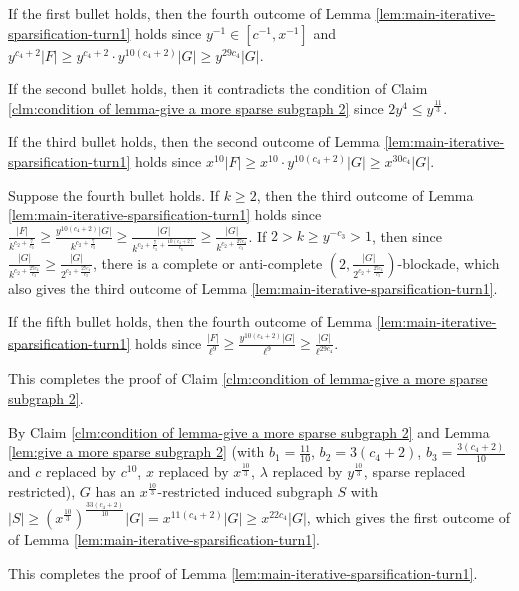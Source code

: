 \documentclass[a4paper,11pt]{article}
\let\oldendproof\endproof
\renewenvironment{proof}[1][\proofname]{%
	\oldproof[\normalfont\bfseries #1]%
}{\oldendproof}
\renewcommand{\qedsymbol}{$\square$}%
\newenvironment{subproof}[1][\normalfont\it Subproof]{%
	\renewcommand{\qedsymbol}{{\tiny{$\blacksquare$}}}%
	\begin{proof}[#1]%
	}{%
	\end{proof}%
}
\begin{document}
\begin{proof}
\begin{subproof}[Proof of Claim \ref{clm:condition of lemma-give a more sparse subgraph 2}]
            
            If the first bullet holds, then the fourth outcome of Lemma \ref{lem:main-iterative-sparsification-turn1} holds since $y^{-1}\in [c^{-1},x^{-1}]$ and $y^{c_4+2}|F|\geq y^{c_4+2}\cdot y^{10(c_4+2)}|G|\geq y^{29c_4}|G|$.

            If the second bullet holds, then it contradicts the condition of Claim \ref{clm:condition of lemma-give a more sparse subgraph 2} since $2y^4\leq y^{\frac{11}{3}}$.

            
            If the third bullet holds, then the second outcome of Lemma \ref{lem:main-iterative-sparsification-turn1} holds since $x^{10}|F|\geq x^{10}\cdot y^{10(c_4+2)}|G|\geq x^{30c_4}|G|$.  

            Suppose the fourth bullet holds. 
            If $k\geq2$, then the third outcome of Lemma \ref{lem:main-iterative-sparsification-turn1} holds since $\frac{|F|}{k^{c_2+\frac{7}{c_3}}}\geq \frac{y^{10(c_4+2)}|G|}{k^{c_2+\frac{7}{c_3}}}\geq \frac{|G|}{k^{c_2+\frac{7}{c_3}+\frac{10(c_4+2)}{c_3}}}\geq \frac{|G|}{k^{c_2+\frac{27c_4}{c_3}}}$. 
            If $2>k\geq y^{-c_3}> 1$, then since $\frac{|G|}{k^{c_2+\frac{27c_4}{c_3}}}\geq \frac{|G|}{2^{c_2+\frac{27c_4}{c_3}}}$, there is a complete or anti-complete $(2, \frac{|G|}{2^{c_2+\frac{27c_4}{c_3}}})$-blockade, which also gives the third outcome of Lemma \ref{lem:main-iterative-sparsification-turn1}.  

            If the fifth bullet holds, then the fourth outcome of Lemma \ref{lem:main-iterative-sparsification-turn1} holds since $\frac{|F|}{\ell^{9}}\geq \frac{y^{10(c_4+2)}|G|}{\ell^{9}}\geq \frac{|G|}{\ell^{29c_4}}$.  

            This completes the proof of Claim \ref{clm:condition of lemma-give a more sparse subgraph 2}. 
        \end{subproof}
        
        By Claim \ref{clm:condition of lemma-give a more sparse subgraph 2} and Lemma \ref{lem:give a more sparse subgraph 2} (with $b_1=\frac{11}{10}$, $b_2=3(c_4+2)$, $b_3=\frac{3(c_4+2)}{10}$ and $c$ replaced by $c^{10}$, $x$ replaced by $x^{\frac{10}{3}}$, $\lambda$ replaced by $y^{\frac{10}{3}}$, sparse replaced restricted), $G$ has an $x^{\frac{10}{3}}$-restricted induced subgraph $S$ with $|S|\geq (x^{\frac{10}{3}})^{\frac{33(c_4+2)}{10}}|G|= x^{11(c_4+2)}|G|\geq x^{22c_4}|G|$, which gives the first outcome of of Lemma \ref{lem:main-iterative-sparsification-turn1}. 

        This completes the proof of Lemma \ref{lem:main-iterative-sparsification-turn1}. 
    \end{proof}
    
\end{document}
